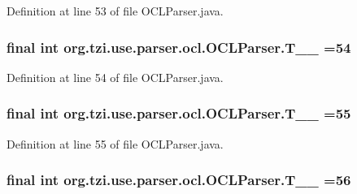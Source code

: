Definition at line 53 of file O\-C\-L\-Parser.\-java.

\hypertarget{classorg_1_1tzi_1_1use_1_1parser_1_1ocl_1_1_o_c_l_parser_af7439e6e19b934765bba2ea8648975ad}{
\subsubsection[{T\-\_\-\-\_\-54}]{\setlength{\rightskip}{0pt plus 5cm}final int org.\-tzi.\-use.\-parser.\-ocl.\-O\-C\-L\-Parser.\-T\-\_\-\-\_ =54\hspace{0.3cm}{\ttfamily [static]}}}\label{classorg_1_1tzi_1_1use_1_1parser_1_1ocl_1_1_o_c_l_parser_af7439e6e19b934765bba2ea8648975ad}


Definition at line 54 of file O\-C\-L\-Parser.\-java.

\hypertarget{classorg_1_1tzi_1_1use_1_1parser_1_1ocl_1_1_o_c_l_parser_a0a59419ffc583a3633fbc94256ab1612}{
\subsubsection[{T\-\_\-\-\_\-55}]{\setlength{\rightskip}{0pt plus 5cm}final int org.\-tzi.\-use.\-parser.\-ocl.\-O\-C\-L\-Parser.\-T\-\_\-\-\_ =55\hspace{0.3cm}{\ttfamily [static]}}}\label{classorg_1_1tzi_1_1use_1_1parser_1_1ocl_1_1_o_c_l_parser_a0a59419ffc583a3633fbc94256ab1612}


Definition at line 55 of file O\-C\-L\-Parser.\-java.

\hypertarget{classorg_1_1tzi_1_1use_1_1parser_1_1ocl_1_1_o_c_l_parser_a505d9b322d1f7d0c667b81877b8784ab}{
\subsubsection[{T\-\_\-\-\_\-56}]{\setlength{\rightskip}{0pt plus 5cm}final int org.\-tzi.\-use.\-parser.\-ocl.\-O\-C\-L\-Parser.\-T\-\_\-\-\_ =56\hspace{0.3cm}{\ttfamily [static]}}}\label{classorg_1_1tzi_1_1use_1_1parser_1_1ocl_1_1_o_c_l_parser_a505d9b322d1f7d0c667b81877b8784ab}


